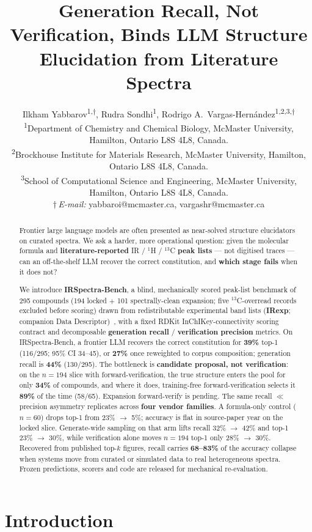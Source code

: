 \documentclass{article}
\title{Generation Recall, Not Verification, Binds LLM Structure Elucidation from Literature Spectra}
\author{
Ilkham Yabbarov\textsuperscript{1,$\dagger$},
Rudra Sondhi\textsuperscript{1},
Rodrigo A.\ Vargas-Hern\'andez\textsuperscript{1,2,3,$\dagger$}\\
\textsuperscript{1}Department of Chemistry and Chemical Biology, McMaster University,
Hamilton, Ontario L8S 4L8, Canada.\\
\textsuperscript{2}Brockhouse Institute for Materials Research, McMaster University,
Hamilton, Ontario L8S 4L8, Canada.\\
\textsuperscript{3}School of Computational Science and Engineering, McMaster University,
Hamilton, Ontario L8S 4L8, Canada.\\
$\dagger$\,\textit{E-mail:} yabbaroi@mcmaster.ca, vargashr@mcmaster.ca
}
\begin{document}
\maketitle
{}

\begin{abstract}
Frontier large language models are often presented as near-solved structure elucidators on
curated spectra. We ask a harder, more operational question: given the molecular formula and
\textbf{literature-reported} IR / $^1$H / $^{13}$C \textbf{peak lists} --- not digitised traces ---
can an off-the-shelf LLM recover the correct constitution, and \textbf{which stage fails} when
it does not?

We introduce \textbf{IRSpectra-Bench}, a blind, mechanically scored peak-list benchmark of 295
compounds (194 locked $+$ 101 spectrally-clean expansion; five $^{13}$C-overread records
excluded before scoring) drawn from redistributable experimental band lists (\textbf{IRexp}; companion Data
Descriptor)~\citep{yabbarov2026irexp}, with a fixed RDKit InChIKey-connectivity scoring contract
and decomposable \textbf{generation recall} / \textbf{verification precision} metrics.
On IRSpectra-Bench, a frontier LLM recovers the correct constitution for \textbf{39\%} top-1
(116/295; 95\% CI 34--45), or \textbf{27\%} once reweighted to corpus composition; generation
recall is \textbf{44\%} (130/295).
The bottleneck is \textbf{candidate proposal, not verification}: on the $n{=}194$ slice with
forward-verification, the true structure enters the pool for only \textbf{34\%} of compounds,
and where it does, training-free forward-verification selects it \textbf{89\%} of the time (58/65).
Expansion forward-verify is pending.
The same recall $\ll$ precision asymmetry replicates across \textbf{four vendor families}.
A formula-only control ($n{=}60$) drops top-1 from 23\% $\to$ 5\%; accuracy is flat in source-paper year
on the locked slice.
Generate-wide sampling on that arm lifts recall 32\% $\to$ 42\% and top-1 23\% $\to$ 30\%, while
verification alone moves $n{=}194$ top-1 only 28\% $\to$ 30\%.
Recovered from published top-$k$ figures, recall carries \textbf{68--83\%} of the accuracy
collapse when systems move from curated or simulated data to real heterogeneous spectra.
Frozen predictions, scorers and code are released for mechanical re-evaluation.
\end{abstract}

\section{Introduction}
\label{sec:introduction}
\end{document}
